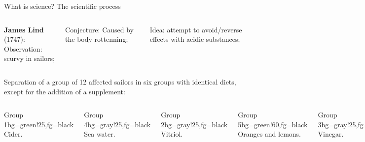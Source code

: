 \documentclass[t]{beamer}
\begin{document}
\begin{ftst}
{What is science?}
{The scientific process}
\vspace{-0.4em}
\begin{columns}[T]
	\textbf{James Lind} (1747):\\
	\bitems Observation: scurvy in sailors;
		\item Conjecture: Caused by the body rottenning;
		\item Idea: attempt to avoid/reverse effects with acidic substances;
	\eitem
{}
\end{columns}
\vone
Separation of a group of 12 affected sailors in six groups with identical diets, except for the addition of a supplement:
\begin{columns}[T]
\begin{colorblock}{Group 1}{bg=green!25,fg=black}
	\small Cider.
\end{colorblock}
\begin{colorblock}{Group 4}{bg=gray!25,fg=black}
	\small Sea water.
\end{colorblock}
\begin{colorblock}{Group 2}{bg=gray!25,fg=black}
	\small Vitriol.
\end{colorblock}
\begin{colorblock}{Group 5}{bg=green!60,fg=black}
	\small Oranges and lemons.
\end{colorblock}
\begin{colorblock}{Group 3}{bg=gray!25,fg=black}
	\small Vinegar.
\end{colorblock}
\begin{colorblock}{Group 6}{bg=gray!25,fg=black}
	\small Tea.
\end{colorblock}
\end{columns}
\end{ftst}

\end{document}
